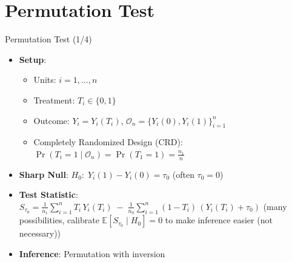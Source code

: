 \documentclass[10pt, handout]{beamer}
\theoremstyle{plain}
\newcommand{\E}{\mathbb{E}}
\begin{document}
\section{Permutation Test}

\begin{frame}{Permutation Test (1/4)}

\begin{itemize}
  \item \textbf{Setup}:
  \setlength{\itemsep}{6pt} %
    \begin{itemize}
      \item Units: $i = 1,\ldots,n$
      \item Treatment: $T_i \in \{0,1\}$
      \item Outcome: $Y_i = Y_i(T_i)$, \quad $\mathcal{O}_n=\{Y_i(0),Y_i(1)\}_{i=1}^n$
      \item Completely Randomized Design (CRD): $\Pr(T_i=1\mid \mathcal{O}_n)=\Pr(T_1=1)=\tfrac{n_1}{n}$
    \end{itemize}

  \pause
  \vspace{1em}
  \item \textbf{Sharp Null}: $H_0:\; Y_i(1)-Y_i(0)=\tau_0$ \; (often $\tau_0=0$)

  \pause
  \vspace{1em}
  \item \textbf{Test Statistic}:
  $S_{\tau_0}=\frac{1}{n_1}\sum_{i=1}^n T_i\,Y_i(T_i)\;-\;\frac{1}{n_0}\sum_{i=1}^n (1-T_i)\,(Y_i(T_i) + \tau_0)$ \quad (many possibilities, calibrate $\E[S_{\tau_0} \mid H_0] = 0$ to make inference easier (not necessary))

  \pause
  \vspace{1em}
  \item \textbf{Inference}: Permutation with inversion
  
\end{itemize}
\end{frame}
\end{document}
